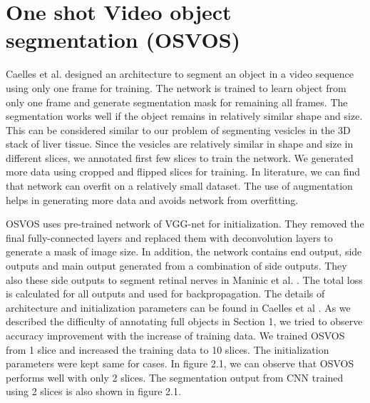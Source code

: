 \section{One shot Video object segmentation (OSVOS)}
Caelles et al. \cite{osvos} designed an architecture to segment an object in a video sequence using only one frame for training. The network is trained to learn object from only one frame and generate segmentation mask for remaining all frames. The segmentation works well if the object remains in relatively similar shape and size. This can be considered similar to our problem of segmenting vesicles in the 3D stack of liver tissue. Since the vesicles are relatively similar in shape and size in different slices, we annotated first few slices to train the network. We generated more data using cropped and flipped slices for training. In literature, we can find that network can overfit on a relatively small dataset. The use of augmentation helps in generating more data and avoids network from overfitting. \par
OSVOS uses pre-trained network of VGG-net for initialization. They removed the final fully-connected layers and replaced them with deconvolution layers to generate a mask of image size. In addition, the network contains end output, side outputs and main output generated from a combination of side outputs. They also these side outputs to segment retinal nerves in Maninic et al. \cite{maninis:2016}. The total loss is calculated for all outputs and used for backpropagation. The details of architecture and initialization parameters can be found in Caelles et al \cite{osvos}. As we described the difficulty of annotating full objects in Section 1, we tried to observe accuracy improvement with the increase of training data. We trained OSVOS from 1 slice and increased the training data to 10 slices. The initialization parameters were kept same for cases. In figure 2.1, we can observe that OSVOS performs well with only 2 slices. The segmentation output from CNN trained using 2 slices is also shown in figure 2.1.\par
